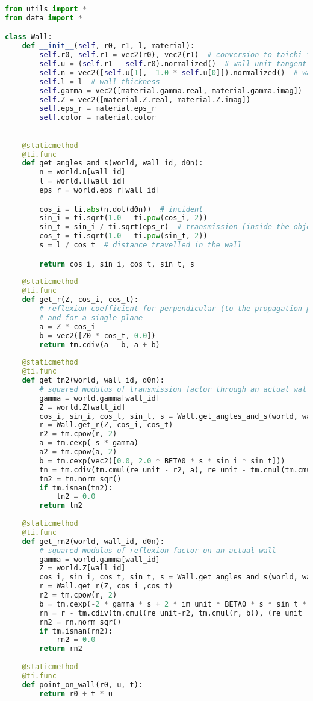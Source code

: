 \begin{lstlisting}[language=python]
from utils import *
from data import *

class Wall:
    def __init__(self, r0, r1, l, material):
        self.r0, self.r1 = vec2(r0), vec2(r1)  # conversion to taichi types
        self.u = (self.r1 - self.r0).normalized()  # wall unit tangent
        self.n = vec2([self.u[1], -1.0 * self.u[0]]).normalized()  # wall unit normal
        self.l = l  # wall thickness
        self.gamma = vec2([material.gamma.real, material.gamma.imag])
        self.Z = vec2([material.Z.real, material.Z.imag])
        self.eps_r = material.eps_r
        self.color = material.color

    
    @staticmethod
    @ti.func
    def get_angles_and_s(world, wall_id, d0n):
        n = world.n[wall_id]
        l = world.l[wall_id]
        eps_r = world.eps_r[wall_id]

        cos_i = ti.abs(n.dot(d0n))  # incident
        sin_i = ti.sqrt(1.0 - ti.pow(cos_i, 2))
        sin_t = sin_i / ti.sqrt(eps_r)  # transmission (inside the object)
        cos_t = ti.sqrt(1.0 - ti.pow(sin_t, 2))
        s = l / cos_t  # distance travelled in the wall

        return cos_i, sin_i, cos_t, sin_t, s
    
    @staticmethod
    @ti.func
    def get_r(Z, cos_i, cos_t):
        # reflexion coefficient for perpendicular (to the propagation plane) polarisation
        # and for a single plane
        a = Z * cos_i
        b = vec2([Z0 * cos_t, 0.0])
        return tm.cdiv(a - b, a + b)
    
    @staticmethod
    @ti.func
    def get_tn2(world, wall_id, d0n):
        # squared modulus of transmission factor through an actual wall
        gamma = world.gamma[wall_id]
        Z = world.Z[wall_id]
        cos_i, sin_i, cos_t, sin_t, s = Wall.get_angles_and_s(world, wall_id, d0n)
        r = Wall.get_r(Z, cos_i, cos_t)
        r2 = tm.cpow(r, 2)
        a = tm.cexp(-s * gamma)
        a2 = tm.cpow(a, 2)
        b = tm.cexp(vec2([0.0, 2.0 * BETA0 * s * sin_i * sin_t]))
        tn = tm.cdiv(tm.cmul(re_unit - r2, a), re_unit - tm.cmul(tm.cmul(r2, a2), b))
        tn2 = tn.norm_sqr()
        if tm.isnan(tn2):
            tn2 = 0.0
        return tn2
    
    @staticmethod
    @ti.func
    def get_rn2(world, wall_id, d0n):
        # squared modulus of reflexion factor on an actual wall
        gamma = world.gamma[wall_id]
        Z = world.Z[wall_id]
        cos_i, sin_i, cos_t, sin_t, s = Wall.get_angles_and_s(world, wall_id, d0n)
        r = Wall.get_r(Z, cos_i ,cos_t)
        r2 = tm.cpow(r, 2)
        b = tm.cexp(-2 * gamma * s + 2 * im_unit * BETA0 * s * sin_t * sin_i)
        rn = r - tm.cdiv(tm.cmul(re_unit-r2, tm.cmul(r, b)), (re_unit - tm.cmul(r2, b)))
        rn2 = rn.norm_sqr()
        if tm.isnan(rn2):
            rn2 = 0.0
        return rn2
    
    @staticmethod
    @ti.func
    def point_on_wall(r0, u, t):
        return r0 + t * u

\end{lstlisting}